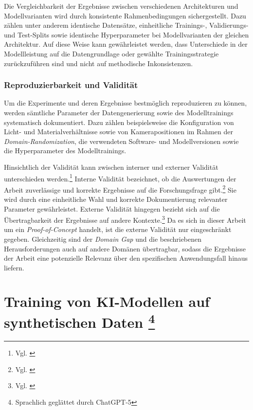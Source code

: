 Die Vergleichbarkeit der Ergebnisse zwischen verschiedenen Architekturen und Modellvarianten wird durch konsistente Rahmenbedingungen sichergestellt. Dazu zählen unter anderem identische Datensätze, einheitliche Trainings-, Validierungs- und Test-Splits sowie identische Hyperparameter bei Modellvarianten der gleichen Architektur. Auf diese Weise kann gewährleistet werden, dass Unterschiede in der Modellleistung auf die Datengrundlage oder gewählte Trainingsstrategie zurückzuführen sind und nicht auf methodische Inkonsistenzen.


\subsection{Reproduzierbarkeit und Validität}
Um die Experimente und deren Ergebnisse bestmöglich reproduzieren zu können, werden sämtliche Parameter der Datengenerierung sowie des Modelltrainings systematisch dokumentiert. Dazu zählen beispielsweise die Konfiguration von Licht- und Materialverhältnisse sowie von Kamerapositionen im Rahmen der \textit{Domain-Randomization}, die verwendeten Software- und Modellversionen sowie die Hyperparameter des Modelltrainings.

Hinsichtlich der Validität kann zwischen interner und externer Validität unterschieden werden.\footnote{Vgl. \cite[499]{andrade_internal_2018}} Interne Validität bezeichnet, ob die Auswertungen der Arbeit zuverlässige und korrekte Ergebnisse auf die Forschungsfrage gibt.\footnote{Vgl. \cite[499]{andrade_internal_2018}} Sie wird durch eine einheitliche Wahl und korrekte Dokumentierung relevanter Parameter gewährleistet.
Externe Validität hingegen bezieht sich auf die Übertragbarkeit der Ergebnisse auf andere Kontexte.\footnote{Vgl. \cite[499]{andrade_internal_2018}} Da es sich in dieser Arbeit um ein \textit{Proof-of-Concept} handelt, ist die externe Validität nur eingeschränkt gegeben. Gleichzeitig sind der \textit{Domain Gap} und die beschriebenen Herausforderungen auch auf andere Domänen übertragbar, sodass die Ergebnisse der Arbeit eine potenzielle Relevanz über den spezifischen Anwendungsfall hinaus liefern.


\chapter[Training von KI-Modellen auf synthetischen Daten]{Training von \ac{KI}-Modellen auf synthetischen Daten \footnote{Sprachlich geglättet durch ChatGPT-5}}
\label{chapter:praktische_umsetzung}

